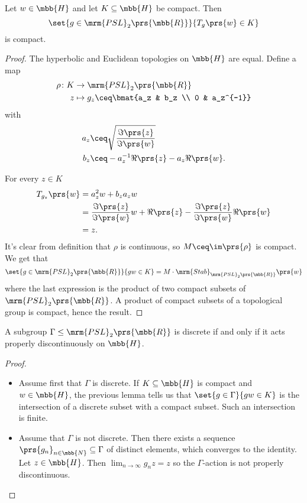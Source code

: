 \documentclass[10pt, twoside]{book}
\begin{document}
\begin{lemma}
Let $w \in \mbb{H}$ and let $K \subseteq \mbb{H}$ be compact. Then
\[\set{g \in \mrm{PSL}_2\prs{\mbb{R}}}{T_g\prs{w} \in K}\]
is compact.
\end{lemma}

\begin{proof}
The hyperbolic and Euclidean topologies on $\mbb{H}$ are equal. Define a map
\begin{align*}
\rho \colon K &\to \mrm{PSL}_2\prs{\mbb{R}} \\
z &\mapsto g_z \ceq \bmat{a_z & b_z \\ 0 & a_z^{-1}}
\end{align*}
with
\begin{align*}
a_z &\ceq \sqrt{\frac{\Im\prs{z}}{\Im\prs{w}}} \\
b_z &\ceq -a_z^{-1} \Re\prs{z} - a_z \Re\prs{w} \text{.}
\end{align*}

For every $z \in K$
\begin{align*}
T_{g_z}\prs{w} &= a_z^2 w + b_z a_z w
\\&=
\frac{\Im\prs{z}}{\Im\prs{w}} w + \Re\prs{z} - \frac{\Im\prs{z}}{\Im\prs{w}} \Re\prs{w}
\\&= z \text{.}
\end{align*}
It's clear from definition that $\rho$ is continuous, so $M \ceq \im\prs{\rho}$ is compact. We get that
\[\set{g \in \mrm{PSL}_2\prs{\mbb{R}}}{gw \in K} = M \cdot \mrm{Stab}_{\mrm{PSL}_2\prs{\mbb{R}}}\prs{w}\]
where the last expression is the product of two compact subsets of $\mrm{PSL}_2\prs{\mbb{R}}$. A product of compact subsets of a topological group is compact, hence the result.
\end{proof}

\begin{theorem}
A subgroup $\Gamma \leq \mrm{PSL}_2\prs{\mbb{R}}$ is discrete if and only if it acts properly discontinuously on $\mbb{H}$.
\end{theorem}

\begin{proof}
\begin{itemize}
\item Assume first that $\Gamma$ is discrete. If $K \subseteq \mbb{H}$ is compact and $w \in \mbb{H}$, the previous lemma tells us that $\set{g \in \Gamma}{gw \in K}$ is the intersection of a discrete subset with a compact subset. Such an intersection is finite.

\item Assume that $\Gamma$ is not discrete. Then there exists a sequence $\prs{g_n}_{n \in \mbb{N}} \subseteq \Gamma$ of distinct elements, which converges to the identity.
Let $z \in \mbb{H}$. Then $\lim_{n\to\infty} g_nz = z$ so the $\Gamma$-action is not properly discontinuous.
\end{itemize}
\end{proof}
\end{document}

